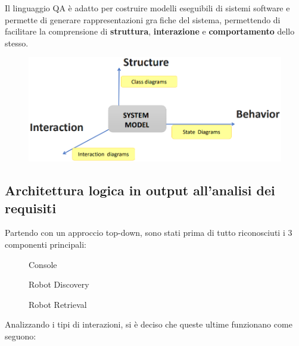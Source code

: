 Il linguaggio QA è adatto per costruire modelli eseguibili di sistemi software e permette di generare rappresentazioni grafiche del sistema,
permettendo di facilitare la comprensione di \textbf{struttura}, \textbf{interazione} e \textbf{comportamento} dello stesso.

\begin{figure}[H]
  \centering
  \includegraphics[width=1\textwidth]{res/logicalArchitecture.png}%
  \label{fig:logicalArchitecture}
\end{figure}

\subsection{Architettura logica in output all'analisi dei requisiti}

Partendo con un approccio top-down, sono stati prima di tutto riconosciuti i 3 componenti principali:

\begin{figure}[H]
  \centering
  \caption{Console}%
  \label{fig:sp1:req:console}
\end{figure}

\begin{figure}[H]
  \centering
  \caption{Robot Discovery}%
  \label{fig:sp1:req:robotdiscovery}
\end{figure}

\begin{figure}[H]
  \centering
  \caption{Robot Retrieval}%
  \label{fig:sp1:req:robotretrieval}
\end{figure}

Analizzando i tipi di interazioni, si è deciso che queste ultime funzionano come seguono:

